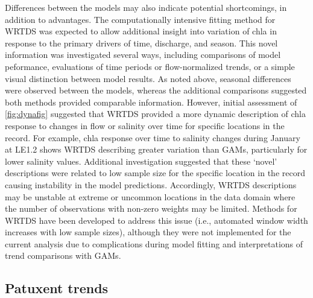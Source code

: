 \documentclass[letterpaper,12pt,oneside]{article}\usepackage[]{graphicx}\usepackage[]{color}
\begin{document}
Differences between the models may also indicate potential shortcomings, in addition to advantages.  The computationally intensive fitting method for \ac{WRTDS} was expected to allow additional insight into variation of \ac{chla} in response to the primary drivers of time, discharge, and season.  This novel information was investigated several ways, including comparisons of model peformance, evaluations of time periods or flow-normalized trends, or a simple visual distinction between model results.  As noted above, seasonal differences were observed between the models, whereas the additional comparisons suggested both methods provided comparable information.  However, initial assessment of \cref{fig:dynafig} suggested that \ac{WRTDS} provided a more dynamic description of \ac{chla} response to changes in flow or salinity over time for specific locations in the record.  For example, \ac{chla} response over time to salinity changes during January at LE1.2 shows \ac{WRTDS} describing greater variation than \acp{GAM}, particularly for lower salinity values.  Additional investigation suggested that these `novel' descriptions were related to low sample size for the specific location in the record causing instability in the model predictions.   Accordingly, \ac{WRTDS} descriptions may be unstable at extreme or uncommon locations in the data domain where the number of observations with non-zero weights may be limited.  Methods for \ac{WRTDS} have been developed to address this issue (i.e., automated window width increases with low sample sizes), although they were not implemented for the current analysis due to complications during model fitting and interpretations of trend comparisons with \acp{GAM}.    

\subsection{Patuxent trends}
\end{document}
